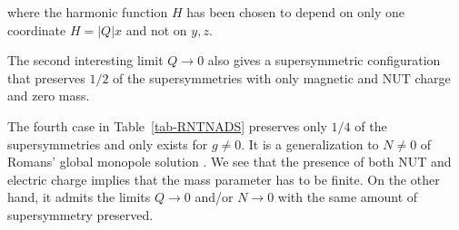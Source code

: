 \documentclass[12pt,a4paper]{article}
\begin{document}
\noindent where the harmonic function $H$ has been chosen to depend on
only one coordinate $H=|Q|x$ and not on $y,z$.

The second interesting limit $Q\rightarrow 0$ also gives a
supersymmetric configuration that preserves $1/2$ of the
supersymmetries with only magnetic and NUT charge and zero mass.

The fourth case in Table~\ref{tab-RNTNADS} preserves only $1/4$ of the
supersymmetries and only exists for $g\neq 0$. It is a generalization
to $N\neq 0$ of Romans' global monopole solution \cite{art:Ro}. We see that the
presence of both NUT and electric charge implies that the mass
parameter has to be finite. On the other hand, it admits the limits
$Q\rightarrow 0$ and/or $N\rightarrow 0$ with the same amount of
supersymmetry preserved.








    


\end{document}
